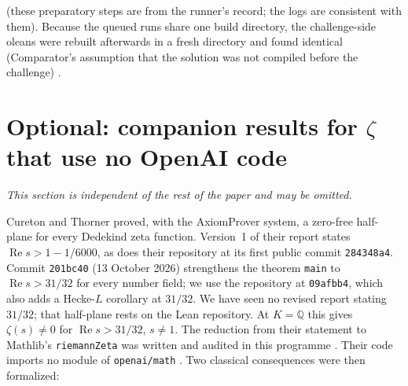 \documentclass[11pt]{article}
\theoremstyle{definition}
\newcommand{\lean}[1]{\texttt{#1}}
\newcommand{\re}{\operatorname{Re}}
\begin{document}
(these preparatory steps are from the runner's record; the logs are consistent with them). Because the queued runs share one build directory, the challenge-side oleans were rebuilt afterwards in a fresh directory and found identical (Comparator's assumption that the solution was not compiled before the challenge) \cite[REVIEW\_COMPARATOR\_LAMBDA\_CHI \S\S2--5 and Addenda~1--2]{bbrecords}.

\section{Optional: companion results for $\zeta$ that use no OpenAI code}\label{sec:companion}

\emph{This section is independent of the rest of the paper and may be omitted.}

Cureton and Thorner \cite{CuretonThorner2026} proved, with the AxiomProver system, a zero-free half-plane for every Dedekind zeta function. Version~1 of their report states $\re s > 1 - 1/6000$, as does their repository \cite{CuretonThornerLean} at its first public commit \lean{284348a4}. Commit \lean{201bc40} (13 October 2026) strengthens the theorem \lean{main} to $\re s > 31/32$ for every number field; we use the repository at \lean{09afbb4}, which also adds a Hecke-$L$ corollary at $31/32$. We have seen no revised report stating $31/32$; that half-plane rests on the Lean repository. At $K = \mathbb{Q}$ this gives $\zeta(s) \ne 0$ for $\re s > 31/32$, $s \ne 1$. The reduction from their statement to Mathlib's \lean{riemannZeta} was written and audited in this programme \cite[REVIEW\_CTQ]{bbrecords}. Their code imports no module of \lean{openai/\allowbreak{}math} \cite[REVIEW\_CTQ]{bbrecords}. Two classical consequences were then formalized:
\end{document}
